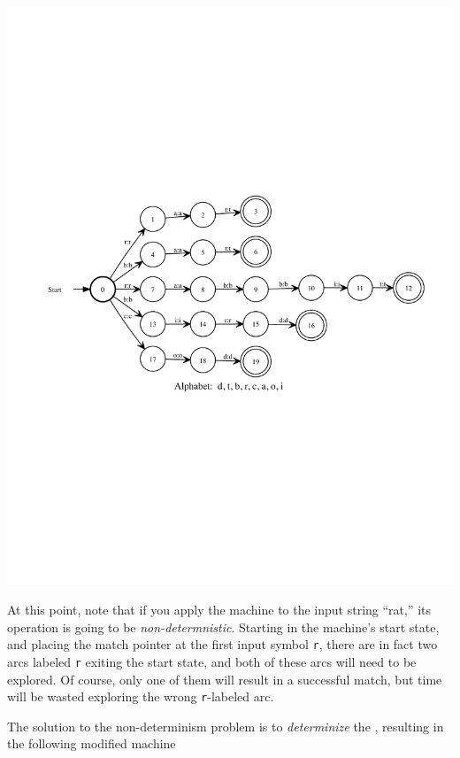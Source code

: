 \begin{center}
\includegraphics[width=135mm]{images/epsremoved.pdf}
\end{center}

\noindent
At this point, note that if you apply the machine to the input string
``rat,'' its operation is going to be \emph{non-determnistic}.  Starting in
the machine's start state, and placing the match pointer at the first input symbol
\texttt{r}, there are in fact two arcs labeled \texttt{r} exiting the start state, 
and both of these arcs will need to be
explored.  Of course, only one of them will result in a successful match, 
but time will be wasted
exploring the wrong \texttt{r}-labeled arc. 

The solution to the non-determinism problem is to \emph{determinize} the
\fsm{}, resulting in the following modified machine


